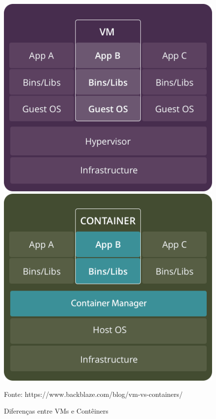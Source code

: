 \documentclass[]{politex}
\newcommand{\legend}[1]{\begin{center}\def\caption{}\caption{#1}\end{center}}
\begin{document}
	\begin{figure}[htb]
		\caption{\label{fig_circulo}Diferenças entre VMs e Contêiners}
		\begin{center}
    		\includegraphics[scale=0.20]{vms.png}
    		\includegraphics[scale=0.20]{containers.png}
		\end{center}
		\legend{Fonte: https://www.backblaze.com/blog/vm-vs-containers/}
	\end{figure}
	
\end{document}
